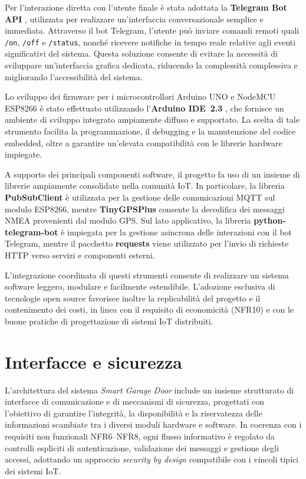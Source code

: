 Per l’interazione diretta con l’utente finale è stata adottata la
\textbf{Telegram Bot API} \cite{TelegramAPI}, utilizzata per realizzare
un’interfaccia conversazionale semplice e immediata. Attraverso il bot
Telegram, l’utente può inviare comandi remoti quali \texttt{/on}, \texttt{/off}
e \texttt{/status}, nonché ricevere notifiche in tempo reale relative agli eventi
significativi del sistema. Questa soluzione consente di evitare la necessità di
sviluppare un’interfaccia grafica dedicata, riducendo la complessità complessiva
e migliorando l’accessibilità del sistema.

Lo sviluppo dei firmware per i microcontrollori Arduino UNO e NodeMCU ESP8266 è
stato effettuato utilizzando l’\textbf{Arduino IDE~2.3} \cite{ArduinoRef}, che
fornisce un ambiente di sviluppo integrato ampiamente diffuso e supportato. La
scelta di tale strumento facilita la programmazione, il debugging e la
manutenzione del codice embedded, oltre a garantire un’elevata compatibilità
con le librerie hardware impiegate.

A supporto dei principali componenti software, il progetto fa uso di un insieme
di librerie ampiamente consolidate nella comunità IoT. In particolare, la
libreria \textbf{PubSubClient} è utilizzata per la gestione delle comunicazioni
MQTT sul modulo ESP8266, mentre \textbf{TinyGPSPlus} consente la decodifica dei
messaggi NMEA provenienti dal modulo GPS. Sul lato applicativo, la libreria
\textbf{python-telegram-bot} è impiegata per la gestione asincrona delle
interazioni con il bot Telegram, mentre il pacchetto \textbf{requests} viene
utilizzato per l’invio di richieste HTTP verso servizi e componenti esterni.

L’integrazione coordinata di questi strumenti consente di realizzare un sistema
software leggero, modulare e facilmente estendibile. L’adozione esclusiva di
tecnologie open source favorisce inoltre la replicabilità del progetto e il
contenimento dei costi, in linea con il requisito di economicità (NFR10) e con
le buone pratiche di progettazione di sistemi IoT distribuiti.


\section{Interfacce e sicurezza}

L’architettura del sistema \textit{Smart Garage Door} include un insieme
strutturato di interfacce di comunicazione e di meccanismi di sicurezza,
progettati con l’obiettivo di garantire l’integrità, la disponibilità e la
riservatezza delle informazioni scambiate tra i diversi moduli hardware e
software. In coerenza con i requisiti non funzionali NFR6–NFR8, ogni flusso
informativo è regolato da controlli espliciti di autenticazione, validazione dei
messaggi e gestione degli accessi, adottando un approccio \textit{security by
design} compatibile con i vincoli tipici dei sistemi IoT.

